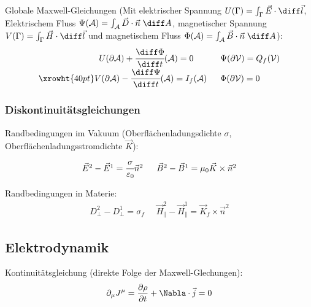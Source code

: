 \documentclass[11pt]{article}
\numberwithin{equation}{section}
\begin{document}
			Globale Maxwell-Gleichungen (Mit elektrischer Spannung $U(\Gamma)=\int_\Gamma \vec{E}\cdot\diff\vec{l}$, Elektrischem Fluss $\Psi(\mathcal{A})=\int_\mathcal{A}\vec{D}\cdot\vec{n}\;\diff A$, magnetischer Spannung $V(\Gamma)=\int_\Gamma \vec{H}\cdot\diff\vec{l}$ und magnetischem Fluss $\Phi(\mathcal{A})=\int_\mathcal{A}\vec{B}\cdot\vec{n}\;\diff A$):
			\begin{equation}
			\begin{array}{rl}
				U(\partial \mathcal{A}) + \cfrac{\diff\Phi}{\diff t}(\mathcal{A}) = 0\phantom{(\mathcal{A})}
				&\;\; \Psi(\partial\mathcal{V}) = Q_f(\mathcal{V}) \\ \xrowht{40pt}
				V(\partial \mathcal{A}) - \cfrac{\diff \Psi}{\diff t}(\mathcal{A}) = I_f(\mathcal{A})
				&\;\; \Phi(\partial\mathcal{V}) = 0 \\
			\end{array}
			\end{equation}

      \subsubsection{Diskontinuitätsgleichungen}
  			Randbedingungen im Vakuum (Oberflächenladungsdichte $\sigma$, Oberflächenladungsstromdichte $\vec{K}$):
  			\begin{equation}
  			\begin{array}{cc}
  				\vec{E}^2 - \vec{E}^1 = \cfrac{\sigma}{\varepsilon_0}\Vec{n}^2
  				&\;\; \vec{B}^2 - \vec{B}^1 = \mu_0\vec{K}\times\Vec{n}^2
  			\end{array}
  			\end{equation}

  			Randbedingungen in Materie:
  			\begin{equation}
  			\begin{array}{cc}
  				D_\perp^2 - D_\perp^1 = \sigma_f
  				&\;\; \vec{H}_\parallel^2 - \vec{H}_\parallel^1 = \vec{K}_f\times\Vec{n}^2
  			\end{array}
  			\end{equation}

    \subsection{Elektrodynamik}
      Kontinuitätsgleichung (direkte Folge der Maxwell-Glechungen):
      \begin{equation}
        \partial_\mu J^\mu = \pder{\rho}{t} + \Nabla\cdot\vec{j} = 0
      \end{equation}
\end{document}
